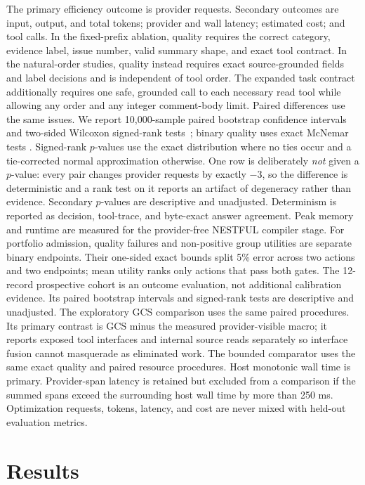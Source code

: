 The primary efficiency outcome is provider requests.  Secondary outcomes are input,
output, and total tokens; provider and wall latency; estimated cost; and tool calls.
In the fixed-prefix ablation, quality requires the correct category, evidence label, issue
number, valid summary shape, and exact tool contract.  In the natural-order studies,
quality instead requires exact source-grounded fields and label decisions and is
independent of tool order.  The expanded task contract additionally requires one safe,
grounded call to each necessary read tool while allowing any order and any integer
comment-body limit.  Paired differences use the same issues.  We report 10,000-sample
paired bootstrap confidence intervals~\cite{efron1993bootstrap} and two-sided Wilcoxon
signed-rank tests~\cite{wilcoxon1945}; binary quality uses exact McNemar tests
\cite{mcnemar1947}.  Signed-rank $p$-values use the exact distribution where no ties occur
and a tie-corrected normal approximation otherwise.  One row is deliberately \emph{not}
given a $p$-value: every pair changes provider
requests by exactly $-3$, so the difference is deterministic and a rank test on it reports an
artifact of degeneracy rather than evidence.  Secondary $p$-values are descriptive and unadjusted.  Determinism is
reported as decision, tool-trace, and byte-exact answer agreement.  Peak memory and
runtime are measured for the provider-free NESTFUL compiler stage.
For portfolio admission, quality failures and non-positive group utilities are separate
binary endpoints.  Their one-sided exact bounds split 5\% error across two actions and two
endpoints; mean utility ranks only actions that pass both gates.  The 12-record prospective
cohort is an outcome evaluation, not additional calibration evidence.  Its paired
bootstrap intervals and signed-rank tests are descriptive and unadjusted.
The exploratory GCS comparison uses the same paired procedures.  Its primary contrast is
GCS minus the measured provider-visible macro; it reports exposed tool interfaces and
internal source reads separately so interface fusion cannot masquerade as eliminated
work.
The bounded comparator uses the same exact quality and paired resource procedures.  Host
monotonic wall time is primary.  Provider-span latency is retained but excluded from a
comparison if the summed spans exceed the surrounding host wall time by more than 250 ms.
Optimization requests, tokens, latency, and cost are never mixed with held-out evaluation
metrics.

\section{Results}
\label{sec:results}

